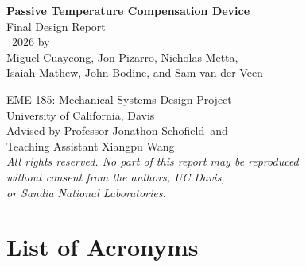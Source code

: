 \documentclass[12pt, letterpaper]{report}%
\newcommand{\instructor}{Professor Jonathon Schofield}
\newcommand{\ta}{Teaching Assistant Xiangpu Wang}
\begin{document}
\begin{center}

	{\large\bfseries Passive Temperature Compensation Device}\\[6pt]
	{\large Final Design Report}\\[24pt]

	\textcopyright\ 2026 by\\[6pt]
	Miguel Cuaycong, Jon Pizarro, Nicholas Metta,\\
	Isaiah Mathew, John Bodine, and Sam van der Veen\\[24pt]

	{\small
	
	EME 185: Mechanical Systems Design Project\\
	University of California, Davis\\[12pt]

	Advised by \instructor\ and\\
	\ta\\[24pt]

	\textit{All rights reserved. No part of this report may be reproduced}\\
	\textit{without consent from the authors, UC Davis,}\\
	\textit{or Sandia National Laboratories.}\\[24pt]

	}

\end{center}

\vspace*{\fill}

\newpage
\tableofcontents
\newpage
\listoffigures
\newpage
\listoftables

\newpage

\chapter*{\large{List of Acronyms}}
\end{document}
